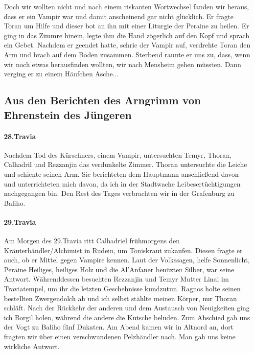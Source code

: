 \documentclass[11pt]{scrreprt}
\begin{document}
Doch wir wollten nicht und nach einem riskanten Wortwechsel fanden wir heraus, dass er ein Vampir war und damit anscheinend gar nicht glücklich. Er fragte Toran um Hilfe und dieser bot an ihn mit einer Liturgie der Peraine zu heilen. Er ging in das Zimmre hinein, legte ihm die Hand zögerlich auf den Kopf und sprach ein Gebet. Nachdem er geendet hatte, schrie der Vampir auf, verdrehte Toran den Arm und brach auf dem Boden zusammen. Sterbend raunte er uns zu, dass, wenn wir noch etwas herausfinden wollten, wir nach Mensheim gehen müssten. Dann verging er zu einem Häufchen Asche... 

\subsection{Aus den Berichten des Arngrimm von Ehrenstein des Jüngeren}

\paragraph{28.Travia}
Nachdem Tod des Kürschners, einem Vampir, untersuchten Temyr, Thoran, Calhadril und Rezzanjin das verdunkelte Zimmer. Thoran untersuchte die Leiche und schiente seinen Arm. Sie berichteten dem Hauptmann anschließend davon und unterrichteten mich davon, da ich in der Stadtwache Leibesertüchtigungen nachgegangen bin. Den Rest des Tages verbrachten wir in der Grafenburg zu Baliho.

\paragraph{29.Travia}
Am Morgen des 29.Travia ritt Calhadriel frühmorgens den Kräuterhändler/Alchimist in Rudein, um Toniskraut zukaufen. Diesen fragte er auch, ob er Mittel gegen Vampire kennen. Laut der Volkssagen, helfe Sonnenlicht, Peraine Heiliges, heiliges Holz und die Al'Anfaner benüzten Silber, war seine Antwort. Währenddessen besuchten Rezzanjin und Temyr Mutter Linai im Traviatempel, um ihr die letzten Geschehnisse kundzutun. Ragnos holte seinen bestellten Zwergendolch ab und ich selbst stählte meinen Körper, nur Thoran schläft. Nach der Rückkehr der anderen und dem Austausch von Neuigkeiten ging ich Borgil holen, während die andere die Kutsche beluden. Zum Abschied gab uns der Vogt zu Baliho fünf Dukaten. Am Abend kamen wir in Altnord an, dort fragten wir über einen verschwundenen Pelzhändler nach. Man gab uns keine wirkliche Antwort.
\end{document}
